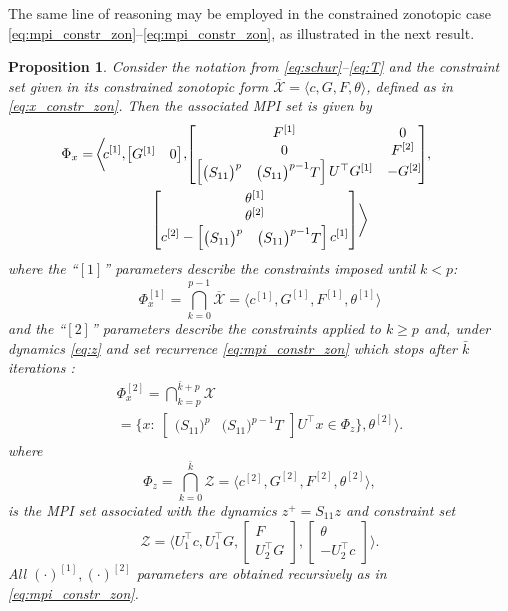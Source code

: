 \documentclass[journal,twoside,web]{ieeecolor}
\newcommand{\re}[1]{\mathbb{R}^{#1}}%
\newcommand{\bbm}{\begin{bmatrix}}
\newcommand{\ebm}{\end{bmatrix}}
\newtheorem{prop}{Proposition}
\newcommand{\bbm}{\begin{bmatrix}}
\newcommand{\ebm}{\end{bmatrix}}
\newtheorem{prop}{Proposition}
\begin{document}
The same line of reasoning may be employed in the constrained zonotopic case \eqref{eq:mpi_constr_zon}--\eqref{eq:mpi_constr_zon}, as illustrated in the next result. 
\begin{prop}
\label{prop:cz}
    Consider the notation from \eqref{eq:schur}--\eqref{eq:T} and the constraint set given in its constrained zonotopic form $\overline{\mathcal X}=\langle c,G,F,\theta\rangle$, defined as in \eqref{eq:x_constr_zon}. Then the associated MPI set is given by 
    \begin{multline}
    \label{eq:mpi-schur-cz}
        \mkern-36mu\Phi_x = \mkern-2mu\biggl\langle \mkern-4mu c^{[1]},\mkern-2mu \bbm G^{[1]} & 0\ebm\mkern-2mu,\mkern-4mu \bbm F^{[1]} & 0\\ 0 & F^{[2]}\\ \bbm \bigl(S_{11}\bigr)^p &\bigl(S_{11}\bigr)^{p-1}T\ebm U^\top G^{[1]} & -G^{[2]}\mkern-4mu\ebm\mkern-4mu,\\
        \bbm \theta^{[1]}\\ \theta^{[2]}\\ c^{[2]}-\bbm \bigl(S_{11}\bigr)^p &\bigl(S_{11}\bigr)^{p-1}T\ebm c^{[1]}\ebm\biggr\rangle
    \end{multline}
    where the ``$[1]$'' parameters describe the constraints imposed until $k<p$:
    \begin{equation}
    \label{eq:omega_x_1_cz}
        \Phi_x^{[1]}=\bigcap\limits_{k=0}^{p-1} \overline{\mathcal X} = \bigl\langle c^{[1]}, G^{[1]}, F^{[1]}, \theta^{[1]}\bigr\rangle
    \end{equation}
and the ``$[2]$'' parameters describe the constraints applied to $k\geq p$ and, under dynamics \eqref{eq:z} and set recurrence \eqref{eq:mpi_constr_zon} which stops after $\bar k$ iterations \cite{10552328}:
    \begin{multline}
        \label{eq:omega_x_2_cz}
        \Phi_x^{[2]}=\bigcap\limits_{k=p}^{\bar k +p} {\mathcal X}\\
        =\{x:\: \bbm \bigl(S_{11}\bigr)^p &\bigl(S_{11}\bigr)^{p-1}T\ebm U^\top x\in \Phi_z\}, \theta^{[2]}\bigr\rangle.
    \end{multline}
    where
    \begin{equation}
        \label{eq:mpi_z_cz}
        \Phi_z =\bigcap\limits_{k=0}^{\bar k} {\mathcal Z}=\langle c^{[2]}, G^{[2]}, F^{[2]}, \theta^{[2]}\rangle,
    \end{equation}
    is the MPI set associated with the dynamics $z^+=S_{11}z$ and constraint set 
    \begin{equation}
    \label{eq:z-cz}
        \mathcal Z = \biggl\langle U_1^\top c, U_1^\top G, \bbm F\\ U_2^\top G\ebm, \bbm \theta\\ -U_2^\top c\ebm\biggr\rangle.
    \end{equation}
    All $(\cdot)^{[1]},(\cdot)^{[2]}$ parameters are obtained recursively as in \eqref{eq:mpi_constr_zon}.
\end{prop}
\end{document}
